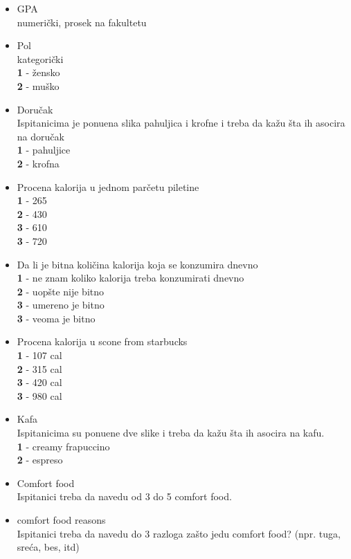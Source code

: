 \documentclass[12pt,a4paper]{article}
\begin{document}
\begin{itemize}
  \item GPA\\
    numeri\v cki, prosek na fakultetu
  \item Pol\\
    kategori\v cki\\
    \textbf{1} - \v zensko\\
    \textbf{2} - mu\v sko
  \item Doru\v cak\\
    Ispitanicima je ponu\dj ena slika pahuljica i krofne i treba da ka\v zu \v sta ih asocira na doru\v cak\\
    \textbf{1} - pahuljice\\
    \textbf{2} - krofna 
  \item Procena kalorija u jednom par\v cetu piletine\\
    \textbf{1} - 265\\ 
    \textbf{2} - 430\\
    \textbf{3} - 610\\
    \textbf{3} - 720
  \item Da li je bitna koli\v cina kalorija koja se konzumira dnevno\\
    \textbf{1} - ne znam koliko kalorija treba konzumirati dnevno\\
    \textbf{2} - uop\v ste nije bitno\\
    \textbf{3} - umereno je bitno\\
    \textbf{3} - veoma je bitno
  \item Procena kalorija u scone from starbucks\\
    \textbf{1} - 107 cal\\ 
    \textbf{2} - 315 cal\\ 
    \textbf{3} - 420 cal\\ 
    \textbf{3} - 980 cal
  \item Kafa\\
    Ispitanicima su ponu\dj ene dve slike i treba da ka\v zu \v sta ih asocira na kafu.\\
   \textbf{1} - creamy frapuccino\\
   \textbf{2} - espreso
  \item Comfort food\\
    Ispitanici treba da navedu od 3 do 5 comfort food.
  \item  comfort food reasons\\
    Ispitanici treba da navedu do 3 razloga za\v sto jedu comfort food? (npr. tuga, sre\' ca, bes, itd)

\end{itemize}
\end{document}
